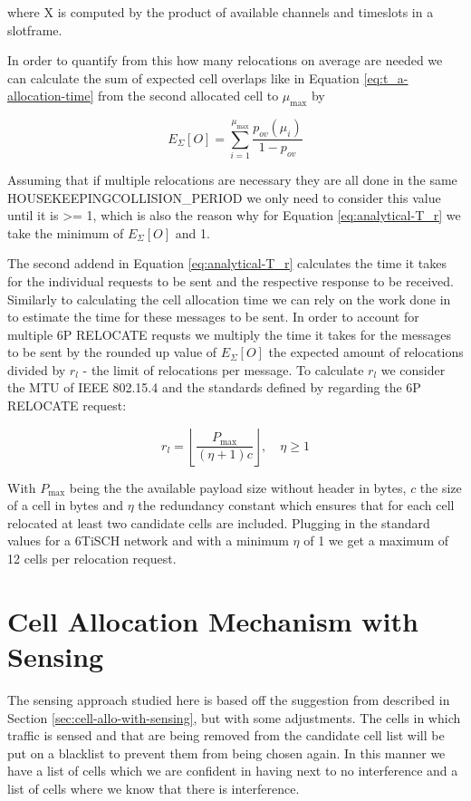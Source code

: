 \documentclass{comnets-thesis}
\begin{document}
where X is computed by the product of available channels and timeslots in a slotframe.

In order to quantify from this how many relocations on average are needed we can calculate the sum of expected cell overlaps like in Equation \ref{eq:t_a-allocation-time} from the second allocated cell to $\mu_{\max}$ by

\begin{equation}
    E_\Sigma[O] = \sum_{i=1}^{\mu_{\max}} \frac{p_{ov}(\mu_i)}{1 - p_{ov}}
    \label{eq:analytical-E_sigma(O)}
\end{equation}

Assuming that if multiple relocations are necessary they are all done in the same HOUSEKEEPINGCOLLISION\_PERIOD we only need to consider this value until it is >= 1, which is also the reason why for Equation \ref{eq:analytical-T_r} we take the minimum of $E_\Sigma[O]$ and 1.


The second addend in Equation \ref{eq:analytical-T_r} calculates the time it takes for the individual requests to be sent and the respective response to be received. Similarly to calculating the cell allocation time we can rely on the work done in \cite{Tasixptransactiontime} to estimate the time for these messages to be sent. In order to account for multiple \ac{6P} RELOCATE requsts we multiply the time it takes for the messages to be sent by the rounded up value of $E_\Sigma[O]$ the expected amount of relocations divided by $r_l$ - the limit of relocations per message. To calculate $r_l$ we consider the MTU of IEEE 802.15.4 and the standards defined by \cite{RFC8480} regarding the \ac{6P} RELOCATE request:

\begin{equation}
    r_l=  \left\lfloor \frac{P_{\max}}{(\eta + 1)c} \right\rfloor, \quad \eta \geq 1 
    \label{eq:analytical-relocation-maximum}
\end{equation}

With $P_{\max}$ being the the available payload size without header in bytes, $c$ the size of a cell in bytes and $\eta$ the redundancy constant which ensures that for each cell relocated at least two candidate cells are included.
Plugging in the standard values for a \ac{6TiSCH} network and with a minimum $\eta$ of 1 we get a maximum of 12 cells per relocation request.


\section{Cell Allocation Mechanism with Sensing}
\label{sec:cell-alloc-mech-sens}
The sensing approach studied here is based off the suggestion from \cite{RFC9033ForMSF} described in Section \ref{sec:cell-allo-with-sensing}, but with some adjustments.
The cells in which traffic is sensed and that are being removed from the candidate cell list will be put on a blacklist to prevent them from being chosen again. In this manner we have a list of cells which we are confident in having next to no interference and a list of cells where we know that there is interference.
\end{document}

